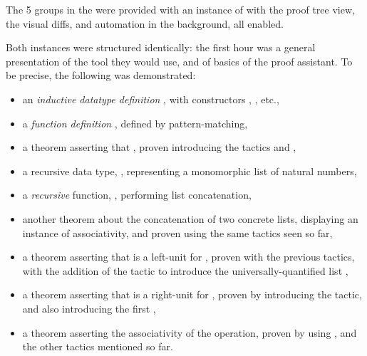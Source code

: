 The 5 groups in the  were provided with an instance of
\PeaCoq{} with the proof tree view, the visual diffs, and automation in the
background, all enabled.

Both instances were structured identically: the first hour was a general
presentation of the tool they would use, and of basics of the \Coq{} proof
assistant.  To be precise, the following was demonstrated:

\begin{itemize}

\item an \emph{inductive datatype definition} , with constructors
, , etc.,

\item a \emph{function definition} , defined by
pattern-matching,

\item a theorem asserting that , proven
introducing the tactics  and ,

\item a recursive data type, , representing a monomorphic
list of natural numbers,

\item a \emph{recursive} function, , performing list
concatenation,

\item another theorem about the concatenation of two concrete lists, displaying
an instance of associativity, and proven using the same tactics seen so far,

\item a theorem asserting that  is a left-unit for
, proven with the previous tactics, with the addition of the
 tactic to introduce the universally-quantified list
,

\item a theorem asserting that  is a right-unit for
, proven by introducing the  tactic, and
also introducing the first ,

\item a theorem asserting the associativity of the  operation,
proven by using , and the other tactics mentioned so far.

\end{itemize}

